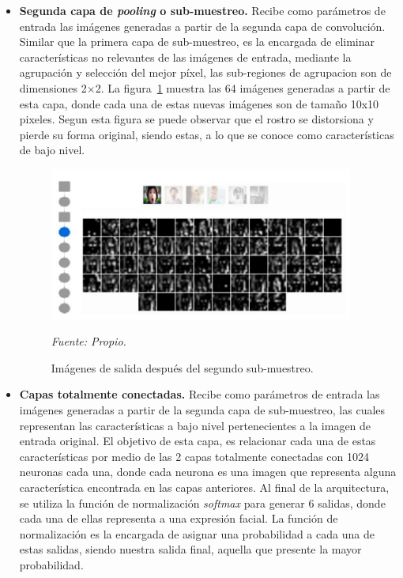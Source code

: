 \begin{itemize}
\item
{
\textbf{Segunda capa de \textit{pooling} o sub-muestreo.} Recibe como parámetros de entrada las imágenes generadas a partir de la segunda capa de convolución. Similar que la primera capa de sub-muestreo, es la encargada de eliminar características no relevantes de las imágenes de entrada, mediante la agrupación y selección del mejor píxel, las sub-regiones de agrupacion son de dimensiones 2$\times$2. La figura~\ref{fig:filtro4} muestra las 64 imágenes generadas a partir de esta capa, donde cada una de estas nuevas imágenes son de tamaño 10x10 pixeles. Segun esta figura se puede observar que el rostro se distorsiona y pierde su forma original, siendo estas, a lo que se conoce como características de bajo nivel.
\begin{figure}[H]
		\centering
		\includegraphics[width=100mm]{./Imagenes/filtro4.png}
		\caption{Imágenes de salida después del segundo sub-muestreo.}
		\vspace{0.15cm}
		\textit{Fuente: Propio.}
		\label{fig:filtro4}
\end{figure}
}
\item
{
\textbf{Capas totalmente conectadas.} Recibe como parámetros de entrada las imágenes generadas a partir de la segunda capa de sub-muestreo, las cuales representan las características a bajo nivel pertenecientes a la imagen de entrada original. El objetivo de esta capa, es relacionar cada una de estas características por medio de las 2 capas totalmente conectadas con 1024 neuronas cada una, donde cada neurona es una imagen que representa alguna característica encontrada en las capas anteriores. Al final de la arquitectura, se utiliza la función de normalización \textit{softmax} para generar 6 salidas, donde cada una de ellas representa a una expresión facial. La función de normalización es la encargada de asignar una probabilidad a cada una de estas salidas, siendo nuestra salida final, aquella que presente la mayor probabilidad.
}
\end{itemize}


